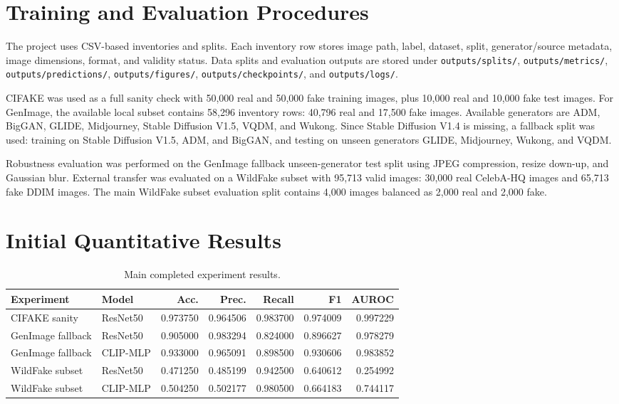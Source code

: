 \documentclass[11pt]{article}
\begin{document}
\section{Training and Evaluation Procedures}

The project uses CSV-based inventories and splits. Each inventory row stores image path, label, dataset, split, generator/source metadata, image dimensions, format, and validity status. Data splits and evaluation outputs are stored under \texttt{outputs/splits/}, \texttt{outputs/metrics/}, \texttt{outputs/predictions/}, \texttt{outputs/figures/}, \texttt{outputs/checkpoints/}, and \texttt{outputs/logs/}.

CIFAKE was used as a full sanity check with 50,000 real and 50,000 fake training images, plus 10,000 real and 10,000 fake test images. For GenImage, the available local subset contains 58,296 inventory rows: 40,796 real and 17,500 fake images. Available generators are ADM, BigGAN, GLIDE, Midjourney, Stable Diffusion V1.5, VQDM, and Wukong. Since Stable Diffusion V1.4 is missing, a fallback split was used: training on Stable Diffusion V1.5, ADM, and BigGAN, and testing on unseen generators GLIDE, Midjourney, Wukong, and VQDM.

Robustness evaluation was performed on the GenImage fallback unseen-generator test split using JPEG compression, resize down-up, and Gaussian blur. External transfer was evaluated on a WildFake subset with 95,713 valid images: 30,000 real CelebA-HQ images and 65,713 fake DDIM images. The main WildFake subset evaluation split contains 4,000 images balanced as 2,000 real and 2,000 fake.

\section{Initial Quantitative Results}

\begin{table}[h]
\centering
\caption{Main completed experiment results.}
\small
\begin{tabular}{llrrrrr}
\toprule
Experiment & Model & Acc. & Prec. & Recall & F1 & AUROC \\
\midrule
CIFAKE sanity & ResNet50 & 0.973750 & 0.964506 & 0.983700 & 0.974009 & 0.997229 \\
GenImage fallback & ResNet50 & 0.905000 & 0.983294 & 0.824000 & 0.896627 & 0.978279 \\
GenImage fallback & CLIP-MLP & 0.933000 & 0.965091 & 0.898500 & 0.930606 & 0.983852 \\
WildFake subset & ResNet50 & 0.471250 & 0.485199 & 0.942500 & 0.640612 & 0.254992 \\
WildFake subset & CLIP-MLP & 0.504250 & 0.502177 & 0.980500 & 0.664183 & 0.744117 \\
\bottomrule
\end{tabular}
\end{table}
\end{document}
